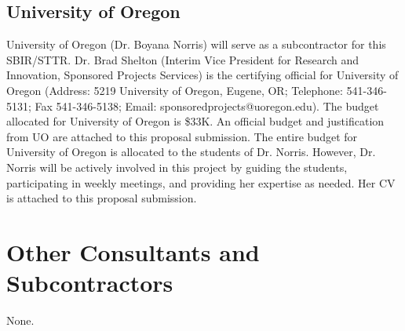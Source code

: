 
\subsection{University of Oregon}


University of Oregon (Dr. Boyana Norris) will serve as a subcontractor for this SBIR/STTR.
Dr. Brad Shelton (Interim Vice President for Research and Innovation, Sponsored Projects Services) is the
certifying official for University of Oregon (Address: 5219 University of Oregon, Eugene, OR;
Telephone: 541-346-5131; Fax 541-346-5138; Email: sponsoredprojects@uoregon.edu). The budget allocated
for University of Oregon is \$33K. An official budget and justification from UO are attached to
this proposal submission. The entire budget for University of Oregon is allocated to the students
of Dr. Norris. However, Dr. Norris will be actively involved in this project by guiding the students,
participating in weekly meetings, and providing her expertise as needed. Her CV is attached to this
proposal submission.

\section{Other Consultants and Subcontractors}
None.